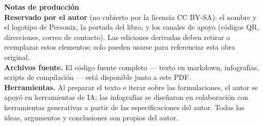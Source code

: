\clearpage
\thispagestyle{empty}
\begin{flushleft}\small\sffamily
\textbf{Notas de producción}\\[1.2em]

\textbf{Reservado por el autor} (no cubierto por la licencia CC BY-SA): el
nombre y el logotipo de Personix, la portada del libro, y los canales de apoyo
(códigos QR, direcciones, correo de contacto). Las ediciones derivadas deben
retirar o reemplazar estos elementos; solo pueden usarse para referenciar esta
obra original.\\[1.2em]

\textbf{Archivos fuente.} El código fuente completo --- texto en markdown,
infografías, scripts de compilación --- está disponible junto a este PDF.\\[1.2em]

\textbf{Herramientas.} Al preparar el texto e iterar sobre las formulaciones,
el autor se apoyó en herramientas de IA; las infografías se diseñaron en
colaboración con herramientas generativas a partir de las especificaciones del
autor. Todas las ideas, argumentos y conclusiones son propios del autor.
\end{flushleft}
\clearpage

